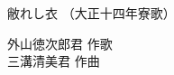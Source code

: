 \documentclass[10pt,b5j]{tarticle} %
\begin{document}
\begin{minipage}[c]{0.7\hsize} %
    \begin{center}
        {\LARGE
            敝れし衣 %
        }
        {\small 
            （大正十四年寮歌） %
        }
    \end{center}
\end{minipage}
\begin{minipage}[c]{0.3\hsize} %
    \begin{flushright} %
        外山徳次郎君 作歌\\三溝清美君 作曲 %
    \end{flushright}
\end{minipage}
\end{document}
